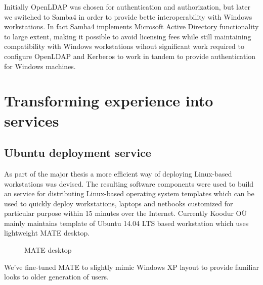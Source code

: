\documentclass{article}
\begin{document}
Initially OpenLDAP was chosen for authentication and authorization,
but later we switched to Samba4 in order to provide bette
interoperability with Windows workstations.
In fact Samba4 implements Microsoft Active Directory functionality
to large extent,
making it possible to avoid licensing fees while still maintaining
compatibility with Windows workstations wihout
significant work required to configure OpenLDAP and Kerberos to
work in tandem to provide authentication for Windows machines.


\section{Transforming experience into services}

\subsection{Ubuntu deployment service}

As part of the major thesis a more efficient way of deploying Linux-based
workstations was devised.
The resulting software components were used to build an service for
distributing Linux-based operating system templates which can be used to
quickly deploy workstations, laptops and netbooks customized
for particular purpose within 15 minutes over the Internet.
Currently Koodur OÜ mainly maintains template of Ubuntu 14.04 LTS based
workstation which uses lightweight MATE desktop.

\begin{figure}[!htb]
\centering
{}
\caption{MATE desktop}
\label{fig:digraph}
\end{figure}

We've fine-tuned MATE to slightly mimic Windows XP layout to provide
familiar looks to older generation of users.
\end{document}
